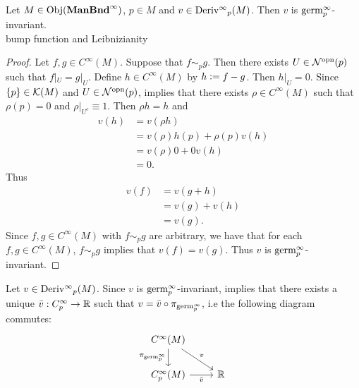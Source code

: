 \documentclass{book}
\begin{document}
	\begin{ex}
		Let $M \in \operatorname{Obj}(\operatorname*{\text{\textbf{ManBnd}}^{\infty}})$, $p \in M$ and $v \in \operatorname{Deriv^{\infty}}_p(M)$. Then $v$ is $\text{germ}^{\infty}_p$-invariant. \\
		 bump function and Leibnizianity
	\end{ex}
	
	\begin{proof}
		Let $f,g \in C^{\infty}(M)$. Suppose that $f \sim_p g$. Then there exists $U \in {\mathcal{N}}^{\text{opn}}(p)$ such that $f|_U = g|_U$. Define $h \in C^{\infty}(M)$ by $h \vcentcolon= f-g$. Then $h|_U = 0$. Since $\{p\} \in \mathcal{K}(M)$ and $U \in {\mathcal{N}}^{\text{opn}}(p)$,  implies that there exists $\rho \in C^{\infty}(M)$ such that $\rho(p) = 0$ and $\rho|_{U^c} \equiv 1$. Then $\rho h = h$ and 
		\begin{align*}
			v(h)
			& = v(\rho h) \\
			& = v(\rho) h(p) + \rho(p) v(h) \\
			& = v(\rho) 0 + 0 v(h) \\
			& = 0.
		\end{align*}
		Thus 
		\begin{align*}
			v(f) 
			& = v(g + h) \\
			& = v(g) + v(h) \\
			& = v(g).
		\end{align*}
		Since $f,g \in C^{\infty}(M)$ with $f \sim_p g$ are arbitrary, we have that for each $f,g \in C^{\infty}(M)$, $f \sim_p g$ implies that $v(f) = v(g)$. Thus $v$ is $\text{germ}^{\infty}_p$-invariant.
	\end{proof}
	
	\begin{note}
		Let $v \in \operatorname{Deriv^{\infty}}_p(M)$. Since $v$ is $\text{germ}^{\infty}_p$-invariant,  implies that there exists a unique $\bar{v}:C^{\infty}_p \rightarrow \mathbb{R}$ such that $v = \bar{v} \circ \pi_{\text{germ}^{\infty}_p}$, i.e the following diagram commutes:
		\[ 
		\begin{tikzcd}
			C^{\infty}(M)  \arrow[dr, "v"]  \arrow[d, "\pi_{\germinf_p}"']  & \\
			C_p^{\infty}(M) \arrow[r, "\bar{v}"'] &  \R  \\
		\end{tikzcd}
		\]
	\end{note}
	
\end{document}
